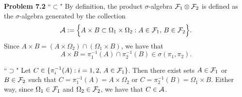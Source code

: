 

\textbf{Problem 7.2}
``$\subset$" By definition, the product $\sigma$-algebra $\mathcal F_1\otimes\mathcal F_2$ is defined as the $\sigma$-algebra generated by the collection
\[
	\mathcal A := \Bigl\{ A\times B\subset \Omega_1\times\Omega_2 : A\in\mathcal F_1,\, B\in\mathcal F_2\Bigr\}.
\]
Since $A\times B = (A\times\Omega_2) \cap (\Omega_1\times B)$, we have that
\[
	A\times B = \pi_1^{-1}(A)\cap\pi_2^{-1}(B) \in \sigma(\pi_1,\pi_2).
\]

``$\supset$" Let $C\in \{ \pi_i^{-1}(A) : i=1,2,\, A\in\mathcal F_1\}$. Then there exist sets $A\in \mathcal F_1$ or $B\in \mathcal F_2$ such that $C = \pi_1^{-1}(A) = A\times\Omega_2$ or $C= \pi_2^{-1}(B) = \Omega_1\times B$. Either way, since $\Omega_1\in\mathcal F_1$ and $\Omega_2\in\mathcal F_2$, we have that $C\in\mathcal A$.

\bigskip

